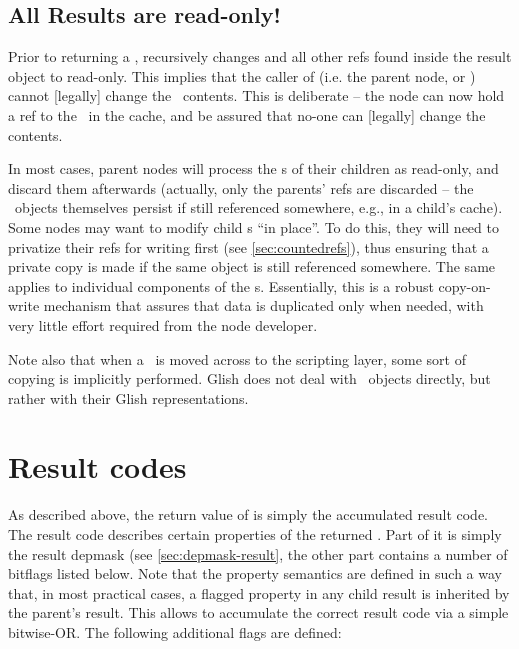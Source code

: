 \subsection{All Results are read-only!}

  Prior to returning a \Result,  recursively changes 
  and all other refs found inside the result object to read-only. This implies
  that the caller of  (i.e. the parent node, or )
  cannot [legally] change the \Result\ contents. This is deliberate -- the node
  can now hold a ref to the \Result\ in the cache, and be assured that no-one
  can [legally] change the contents. 
  
  In most cases, parent nodes will process the \Result{}s of their children as
  read-only, and discard them afterwards (actually, only the parents' refs are
  discarded -- the \Result\ objects themselves persist if still referenced
  somewhere, e.g., in a child's cache). Some nodes may want to modify child
  \Result{}s ``in place''. To do this, they will need to privatize their refs
  for writing first (see \ref{sec:countedrefs}), thus ensuring that a private
  copy is made if the same object is still referenced somewhere. The same
  applies to individual components of the \Result{}s. Essentially, this is a
  robust copy-on-write mechanism that assures that data is duplicated only when
  needed, with very little effort required from the node developer.
  
  Note also that when a \Result\ is moved across to the scripting layer, some
  sort of copying is implicitly performed. Glish does not deal with \Result\
  objects directly, but rather with their Glish representations.

\section{Result codes}
\label{sec:execute-resultcode}

  As described above, the return value of  is simply the
  accumulated result code. The result code describes certain properties of the
  returned \Result. Part of it is simply the result depmask (see
  \ref{sec:depmask-result}, the other part contains a number of bitflags listed
  below. Note that the property semantics are defined in such a way that, in
  most practical cases, a flagged property in any child result is inherited by
  the parent's result. This allows \qq{execute()} to accumulate the correct
  result code via a simple bitwise-OR. The following additional flags are
  defined:
 
